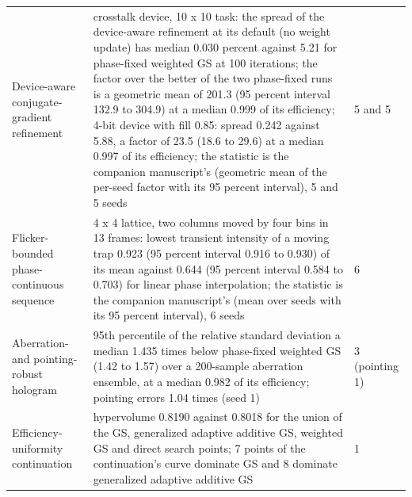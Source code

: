 \begin{longtable}{@{}>{\raggedright\arraybackslash}p{} p{} p{}@{}}
\footnotesize Device-aware conjugate-gradient refinement & \footnotesize crosstalk device, 10 x 10 task: the spread of the device-aware refinement at its default (no weight update) has median 0.030 percent against 5.21 for phase-fixed weighted GS at 100 iterations; the factor over the better of the two phase-fixed runs is a geometric mean of 201.3 (95 percent interval 132.9 to 304.9) at a median 0.999 of its efficiency; 4-bit device with fill 0.85: spread 0.242 against 5.88, a factor of 23.5 (18.6 to 29.6) at a median 0.997 of its efficiency; the statistic is the companion manuscript's (geometric mean of the per-seed factor with its 95 percent interval), 5 and 5 seeds & \footnotesize 5 and 5\\
\footnotesize Flicker-bounded phase-continuous sequence & \footnotesize 4 x 4 lattice, two columns moved by four bins in 13 frames: lowest transient intensity of a moving trap 0.923 (95 percent interval 0.916 to 0.930) of its mean against 0.644 (95 percent interval 0.584 to 0.703) for linear phase interpolation; the statistic is the companion manuscript's (mean over seeds with its 95 percent interval), 6 seeds & \footnotesize 6\\
\footnotesize Aberration- and pointing-robust hologram & \footnotesize 95th percentile of the relative standard deviation a median 1.435 times below phase-fixed weighted GS (1.42 to 1.57) over a 200-sample aberration ensemble, at a median 0.982 of its efficiency; pointing errors 1.04 times (seed 1) & \footnotesize 3 (pointing 1)\\
\footnotesize Efficiency-uniformity continuation & \footnotesize hypervolume 0.8190 against 0.8018 for the union of the GS, generalized adaptive additive GS, weighted GS and direct search points; 7 points of the continuation's curve dominate GS and 8 dominate generalized adaptive additive GS & \footnotesize 1\\
\bottomrule\end{longtable}
